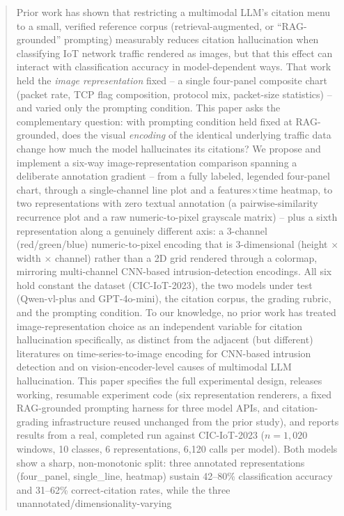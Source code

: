 \documentclass[twocolumn]{svjour3}
\begin{document}
\begin{abstract}
Prior work has shown that restricting a multimodal LLM's citation menu to a small, verified
reference corpus (retrieval-augmented, or ``RAG-grounded'' prompting) measurably reduces citation
hallucination when classifying IoT network traffic rendered as images, but that this effect can
interact with classification accuracy in model-dependent ways. That work held the \emph{image
representation} fixed -- a single four-panel composite chart (packet rate, TCP flag composition,
protocol mix, packet-size statistics) -- and varied only the prompting condition. This paper asks
the complementary question: with prompting condition held fixed at RAG-grounded, does the visual
\emph{encoding} of the identical underlying traffic data change how much the model hallucinates its
citations? We propose and implement a six-way image-representation comparison spanning a
deliberate annotation gradient -- from a fully labeled, legended four-panel chart, through a
single-channel line plot and a features$\times$time heatmap, to two representations with zero
textual annotation (a pairwise-similarity recurrence plot and a raw numeric-to-pixel grayscale
matrix) -- plus a sixth representation along a genuinely different axis: a 3-channel (red/green/blue)
numeric-to-pixel encoding that is 3-dimensional (height $\times$ width $\times$ channel) rather than
a 2D grid rendered through a colormap, mirroring multi-channel CNN-based intrusion-detection
encodings. All six hold constant the dataset (CIC-IoT-2023), the two models under test (Qwen-vl-plus
and GPT-4o-mini), the citation corpus, the grading rubric, and the prompting condition. To
our knowledge, no prior work has treated image-representation choice as an independent variable
for citation hallucination specifically, as distinct from the adjacent (but different) literatures
on time-series-to-image encoding for CNN-based intrusion detection and on vision-encoder-level
causes of multimodal LLM hallucination. This paper specifies the full experimental design, releases
working, resumable experiment code (six representation renderers, a fixed RAG-grounded prompting
harness for three model APIs, and citation-grading infrastructure reused unchanged from the prior
study), and reports results from a real, completed run against CIC-IoT-2023 ($n=1{,}020$ windows,
10 classes, 6 representations, 6,120 calls per model). Both models show a sharp, non-monotonic split:
three annotated representations (four\_panel, single\_line, heatmap) sustain 42--80\% classification
accuracy and 31--62\% correct-citation rates, while the three unannotated/dimensionality-varying

\end{abstract}
\end{document}

